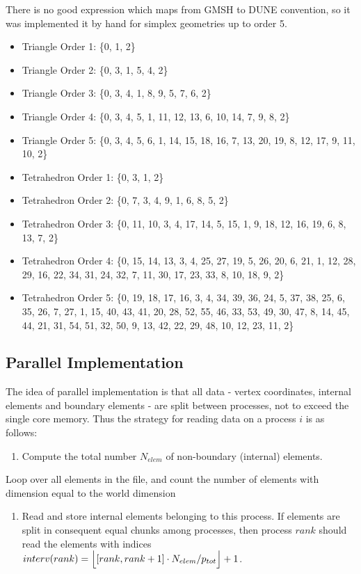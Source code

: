 \noindent
There is no good expression which maps from GMSH to DUNE convention, so it was implemented it by hand for simplex geometries up to order 5.
\begin{itemize}
	\item Triangle Order 1: \{0, 1, 2\}
	\item Triangle Order 2: \{0, 3, 1, 5, 4, 2\}
	\item Triangle Order 3: \{0, 3, 4, 1, 8, 9, 5, 7, 6, 2\}
	\item Triangle Order 4: \{0, 3, 4, 5, 1, 11, 12, 13, 6, 10, 14, 7, 9, 8, 2\}
	\item Triangle Order 5: \{0, 3, 4, 5, 6, 1, 14, 15, 18, 16, 7, 13, 20, 19, 8, 12, 17, 9, 11, 10, 2\}
	
	\item Tetrahedron Order 1: \{0, 3, 1, 2\}
	\item Tetrahedron Order 2: \{0, 7, 3, 4, 9, 1, 6, 8, 5, 2\}
	\item Tetrahedron Order 3: \{0, 11, 10, 3, 4, 17, 14, 5, 15, 1, 9, 18, 12, 16, 19, 6, 8, 13, 7, 2\}
	\item Tetrahedron Order 4: \{0, 15, 14, 13, 3, 4, 25, 27, 19, 5, 26, 20, 6, 21, 1, 12, 28, 29, 16, 22, 34, 31, 24, 32, 7, 11, 30, 17, 23, 33, 8, 10, 18, 9, 2\}
	\item Tetrahedron Order 5: \{0, 19, 18, 17, 16, 3, 4, 34, 39, 36, 24, 5, 37, 38, 25, 6, 35, 26, 7, 27, 1, 15, 40, 43, 41, 20, 28, 52, 55, 46, 33, 53, 49, 30, 47, 8, 14, 45, 44, 21, 31, 54, 51, 32, 50, 9, 13, 42, 22, 29, 48, 10, 12, 23, 11, 2\}
\end{itemize}


\subsection{Parallel Implementation}

The idea of parallel implementation is that all data - vertex coordinates, internal elements and boundary elements - are split between processes, not to exceed the single core memory. Thus the strategy for reading data on a process $i$ is as follows:
\begin{enumerate}
	\item Compute the total number $N_{elem}$ of non-boundary (internal) elements.
\end{enumerate}

\begin{mybox}
Loop over all elements in the file, and count the number of elements with dimension equal to the world dimension
\end{mybox}	
\begin{enumerate}[resume]	
	\item Read and store internal elements belonging to this process. If elements are split in consequent equal chunks among processes, then process $rank$ should read the elements with indices $interv(rank) = \floor[\Big]{ [rank, rank+1] \cdot N_{elem} / p_{tot} } + 1$.
\end{enumerate}

